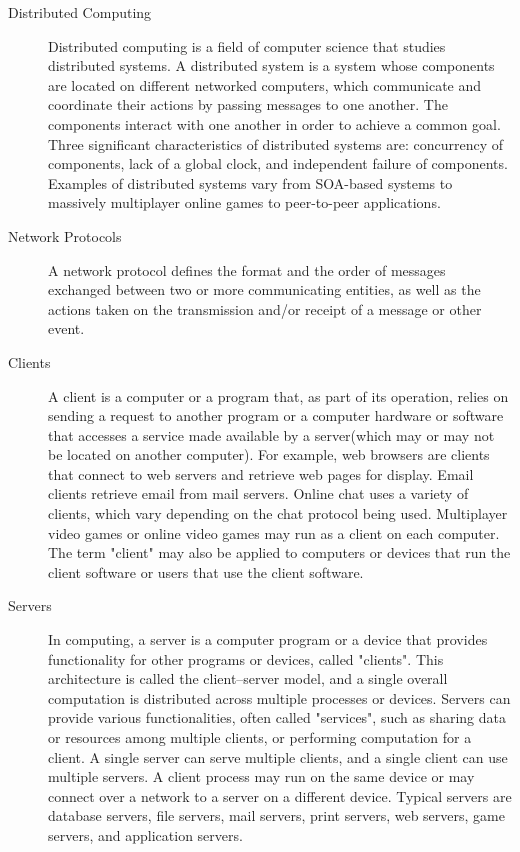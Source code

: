 \documentclass{article}
\begin{document}
\begin{description}
    \item[Distributed Computing] Distributed computing is a field of computer science that studies distributed systems. A distributed system is a system whose components are located on different networked computers, which communicate and coordinate their actions by passing messages to one another. The components interact with one another in order to achieve a common goal. Three significant characteristics of distributed systems are: concurrency of components, lack of a global clock, and independent failure of components. Examples of distributed systems vary from SOA-based systems to massively multiplayer online games to peer-to-peer applications.
     
    \item[Network Protocols] A network protocol defines the format and the order of messages exchanged between
    two or more communicating entities, as well as the actions taken on the transmission
    and/or receipt of a message or other event.

    \item[Clients] A client is a computer or a program that, as part of its operation, relies on sending a request to another program or a computer hardware or software that accesses a service made available by a server(which may or may not be located on another computer). For example, web browsers are clients that connect to web servers and retrieve web pages for display. Email clients retrieve email from mail servers. Online chat uses a variety of clients, which vary depending on the chat protocol being used. Multiplayer video games or online video games may run as a client on each computer. The term "client" may also be applied to computers or devices that run the client software or users that use the client software.
    
    \item[Servers] In computing, a server is a computer program or a device that provides functionality for other programs or devices, called "clients". This architecture is called the client–server model, and a single overall computation is distributed across multiple processes or devices. Servers can provide various functionalities, often called "services", such as sharing data or resources among multiple clients, or performing computation for a client. A single server can serve multiple clients, and a single client can use multiple servers. A client process may run on the same device or may connect over a network to a server on a different device. Typical servers are database servers, file servers, mail servers, print servers, web servers, game servers, and application servers.
    

\end{description}
\end{document}
